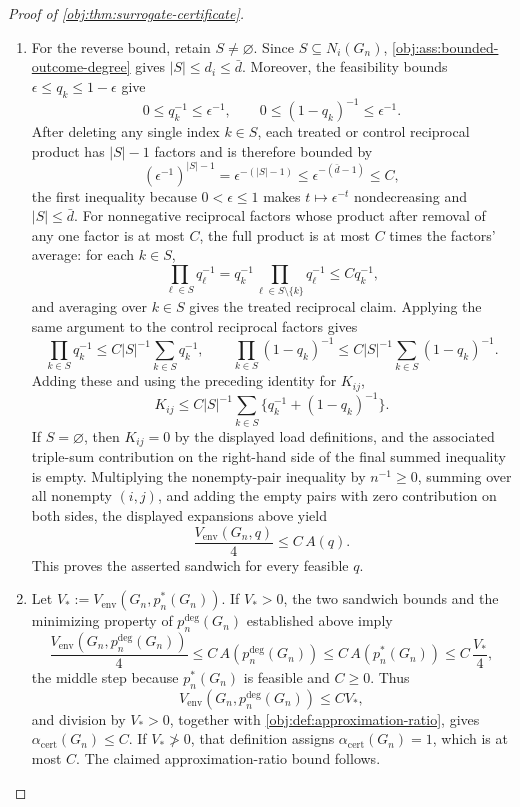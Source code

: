 \begin{proof}[Proof of \cref{obj:thm:surrogate-certificate}]
\begin{enumerate}
\item For the reverse bound, retain \(S\neq\varnothing\).  Since
\(S\subseteq N_i(G_n)\), \cref{obj:ass:bounded-outcome-degree}
gives \(|S|\leq d_i\le\bar d\).  Moreover, the feasibility bounds \(\epsilon\le q_k\le1-\epsilon\) give
\[
0\leq q_k^{-1}\leq\epsilon^{-1},
\qquad
0\leq (1-q_k)^{-1}\leq\epsilon^{-1} .
\]
After deleting any single index \(k\in S\), each treated or control reciprocal product has \(|S|-1\) factors and is therefore bounded by
\[
(\epsilon^{-1})^{|S|-1}
=\epsilon^{-(|S|-1)}
 \leq \epsilon^{-(\bar d-1)}
 \leq C,
\]
the first inequality because \(0<\epsilon\le1\) makes \(t\mapsto\epsilon^{-t}\) nondecreasing and \(|S|\le\bar d\).
For nonnegative reciprocal factors whose product after removal of any one factor is at
most \(C\), the full product is at most \(C\) times the factors' average: for each \(k\in S\),
\[
\prod_{\ell\in S}q_\ell^{-1}
=q_k^{-1}\prod_{\ell\in S\setminus\{k\}}q_\ell^{-1}
\le Cq_k^{-1},
\]
and averaging over \(k\in S\) gives the treated reciprocal claim.  Applying the same argument to the control reciprocal factors gives
\[
\prod_{k\in S}q_k^{-1}
 \leq C|S|^{-1}\sum_{k\in S}q_k^{-1},
\qquad
\prod_{k\in S}(1-q_k)^{-1}
 \leq C|S|^{-1}\sum_{k\in S}(1-q_k)^{-1}.
\]
Adding these and using the preceding identity for \(K_{ij}\),
\[
K_{ij}\leq
C|S|^{-1}\sum_{k\in S}\{q_k^{-1}+(1-q_k)^{-1}\}.
\]
If \(S=\varnothing\), then \(K_{ij}=0\) by the displayed load definitions, and the associated triple-sum contribution on the
right-hand side of the final summed inequality is empty.  Multiplying the nonempty-pair inequality by
\(n^{-1}\geq0\), summing over all nonempty \((i,j)\), and adding the empty pairs with zero contribution on both sides, the displayed
expansions above yield
\[
\frac{V_{\mathrm{env}}(G_n,q)}4\leq C\,A(q).
\]
This proves the asserted sandwich for every feasible \(q\).

\item Let \(V_*:=V_{\mathrm{env}}(G_n,p_n^*(G_n))\).  If \(V_*>0\), the
two sandwich bounds and the minimizing property of \(p_n^{\deg}(G_n)\) established above imply
\[
\frac{V_{\mathrm{env}}\!\left(G_n,p_n^{\deg}(G_n)\right)}4
 \leq C\,A(p_n^{\deg}(G_n))
 \leq C\,A(p_n^*(G_n))
 \leq C\,\frac{V_*}{4},
\]
the middle step because \(p_n^*(G_n)\) is feasible and \(C\ge0\).  Thus
\[
V_{\mathrm{env}}\!\left(G_n,p_n^{\deg}(G_n)\right)\leq C V_*,
\]
and division by \(V_*>0\), together with \cref{obj:def:approximation-ratio},
gives \(\alpha_{\mathrm{cert}}(G_n)\leq C\).  If \(V_*\not>0\), that
definition assigns \(\alpha_{\mathrm{cert}}(G_n)=1\), which is at most
\(C\).  The claimed approximation-ratio bound follows.
\end{enumerate}
\end{proof}
